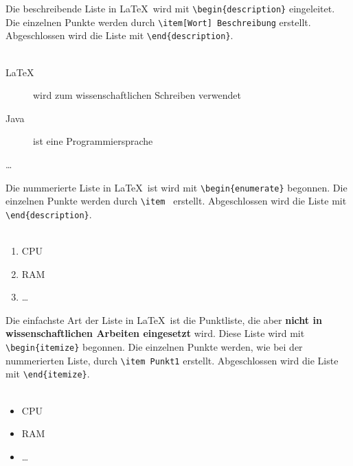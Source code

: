 Die beschreibende Liste in \LaTeX~wird mit \lstinline|\begin{description}|
eingeleitet. Die einzelnen Punkte werden durch \lstinline|\item[Wort] Beschreibung| erstellt.
Abgeschlossen wird die Liste mit \lstinline|\end{description}|.\\
\\
\begin{description}
    \item[LaTeX] wird zum wissenschaftlichen Schreiben verwendet
    \item[Java] ist eine Programmiersprache
    \item[\ldots]
\end{description}
Die nummerierte Liste in \LaTeX~ist wird mit \lstinline|\begin{enumerate}| begonnen.
Die einzelnen Punkte werden durch \lstinline|\item | erstellt.
Abgeschlossen wird die Liste mit \lstinline|\end{description}|.\\
\\
\begin{enumerate}
    \item CPU
    \item RAM
    \item \ldots
\end{enumerate}
Die einfachste Art der Liste in \LaTeX~ist die Punktliste,
die aber \textbf{nicht in wissenschaftlichen Arbeiten eingesetzt} wird.
Diese Liste wird mit \lstinline|\begin{itemize}| begonnen.
Die einzelnen Punkte werden, wie bei der nummerierten Liste, durch \lstinline|\item Punkt1| erstellt.
Abgeschlossen wird die Liste mit \lstinline|\end{itemize}|.\\
\\
\begin{itemize}
    \item CPU
    \item RAM
    \item \ldots
\end{itemize}
